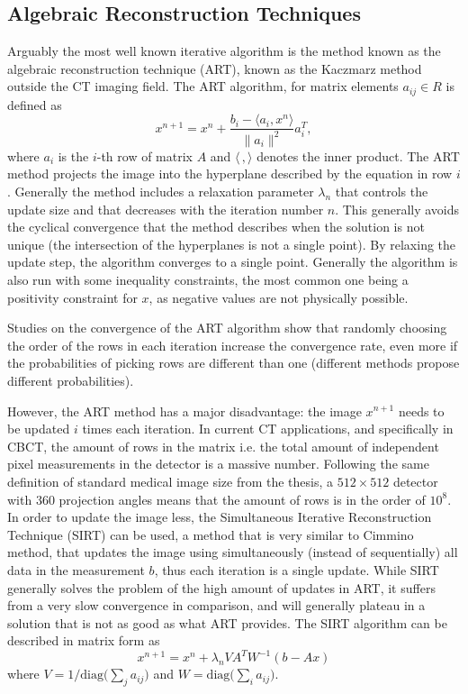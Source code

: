 \subsection{Algebraic Reconstruction Techniques}

Arguably the most well known iterative algorithm is the method known as the algebraic reconstruction technique (ART)\cite{K-1937}, known as the Kaczmarz method outside the CT imaging field. The ART algorithm, for matrix elements $a_{ij}\in R$ is defined as
\begin{equation}
x^{n+1}=x^n+\frac{b_i-\langle a_i,x^n\rangle}{\lVert{a_i}\rVert^2}a_i^T,
\end{equation}
where $a_i$ is the $i$-th row of matrix $A$ and $\langle \,, \rangle$ denotes the inner product. The ART method projects the image into the hyperplane described by the equation in row $i$. Generally the method includes a relaxation parameter $\lambda_n$ that controls the update size and that decreases with the iteration number $n$. This generally avoids the cyclical convergence that the method describes when the solution is not unique (the intersection of the hyperplanes is not a single point). By relaxing the update step, the algorithm converges to a single point. Generally the algorithm is also run with some inequality constraints, the most common one being a positivity constraint for $x$, as negative values are not physically possible.

Studies on the convergence of the ART algorithm show\cite{241889} that randomly choosing the order of the rows in each iteration increase the convergence rate, even more if the probabilities of picking rows are different than one (different methods propose different probabilities)\cite{strohmer2009randomized}\cite{liu2016accelerated}. 

However, the ART method has a major disadvantage: the image $x^{n+1}$ needs to be updated $i$ times each iteration. In current CT applications, and specifically in CBCT, the amount of rows in the matrix i.e. the total amount of independent pixel measurements in the detector is a massive number. Following the same definition of standard medical image size from the thesis, a $512\times512$ detector with 360 projection angles means that the amount of rows is in the order of $10^8$. In order to update the image less, the Simultaneous Iterative Reconstruction Technique (SIRT)\cite{SIRT} can be used, a method that is very similar to Cimmino method\cite{cimmino1938cacolo}, that updates the image using simultaneously (instead of sequentially) all data in the measurement $b$, thus each iteration is a single update. While SIRT generally solves the problem of the high amount of updates in ART, it suffers from a very slow convergence in comparison, and will generally plateau in a solution that is not as good as what ART provides. The SIRT algorithm can be described in matrix form as
\begin{equation}
x^{n+1}=x^n+\lambda_n V A^T W^{-1}\left(b-Ax\right) \label{eq:SIRT}
\end{equation}
where $V=1/\text{diag}\bigl({\sum_j a_{ij}}\bigr)$ and  $W=\text{diag}\bigl({\sum_i a_{ij}}\bigr)$.

